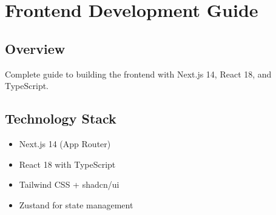 \chapter{Frontend Development Guide}
\label{ch:frontend-guide}

\section{Overview}
Complete guide to building the \lifeos{} frontend with Next.js 14, React 18, and TypeScript.

\section{Technology Stack}
\begin{itemize}
    \item Next.js 14 (App Router)
    \item React 18 with TypeScript
    \item Tailwind CSS + shadcn/ui
    \item Zustand for state management
\end{itemize}


